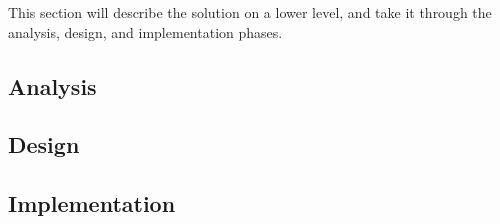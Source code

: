 
This section will describe the solution on a lower level, and take it through the analysis, design, and implementation phases.

\subsection{Analysis}


\subsection{Design}



\subsection{Implementation}

